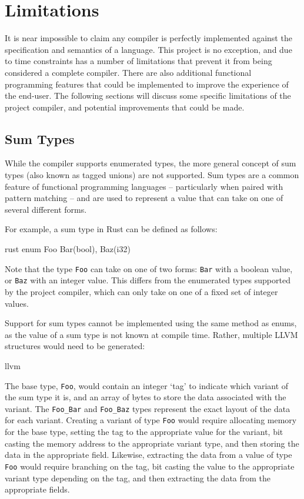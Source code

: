 \section{Limitations}

It is near impossible to claim any compiler is perfectly implemented against the specification and
semantics of a language. This project is no exception, and due to time constraints has a number of
limitations that prevent it from being considered a complete compiler. There are also additional
functional programming features that could be implemented to improve the experience of the end-user.
The following sections will discuss some specific limitations of the project compiler, and potential
improvements that could be made.

\subsection{Sum Types}

While the compiler supports enumerated types, the more general concept of sum types (also known as
tagged unions) are not supported. Sum types are a common feature of functional programming languages
-- particularly when paired with pattern matching -- and are used to represent a value that can take
on one of several different forms.

For example, a sum type in Rust can be defined as follows:

\begin{code}{rust}
    enum Foo {
        Bar(bool),
        Baz(i32)
    }
\end{code}

Note that the type \texttt{Foo} can take on one of two forms: \texttt{Bar} with a boolean value, or
\texttt{Baz} with an integer value. This differs from the enumerated types supported by the project
compiler, which can only take on one of a fixed set of integer values.

Support for sum types cannot be implemented using the same method as enums, as the value of a sum
type is not known at compile time. Rather, multiple LLVM structures would need to be generated:

\begin{code}{llvm}
\end{code}

The base type, \texttt{Foo}, would contain an integer `tag' to indicate which variant of the sum
type it is, and an array of bytes to store the data associated with the variant. The
\texttt{Foo_Bar} and \texttt{Foo_Baz} types represent the exact layout of the data for each variant.
Creating a variant of type \texttt{Foo} would require allocating memory for the base type, setting
the tag to the appropriate value for the variant, bit casting the memory address to the appropriate
variant type, and then storing the data in the appropriate field. Likewise, extracting the data from
a value of type \texttt{Foo} would require branching on the tag, bit casting the value to the
appropriate variant type depending on the tag, and then extracting the data from the appropriate
fields.

